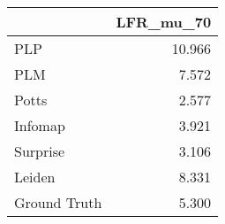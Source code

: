 \begin{tabular}{lr}
\toprule
{} & LFR_mu_70 \\
\midrule
PLP          &    10.966 \\
PLM          &     7.572 \\
Potts        &     2.577 \\
Infomap      &     3.921 \\
Surprise     &     3.106 \\
Leiden       &     8.331 \\
Ground Truth &     5.300 \\
\bottomrule
\end{tabular}
